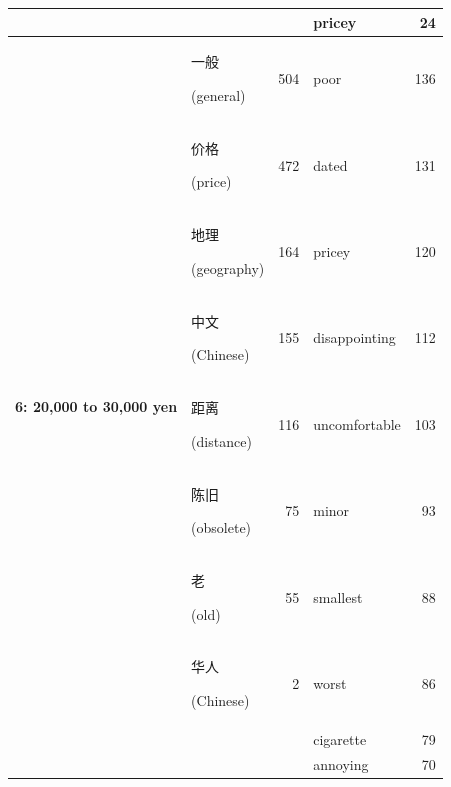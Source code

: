 \documentclass[smallextended,natbib]{svjour3}       %
\begin{document}
\begin{table}[ht]
{\begin{tabular}{|c|lr|lr|}
                                                             &                                                &      & pricey         & 24  \\ \hline
        \multirow{10}{*}{\textbf{6: 20,000 to 30,000 yen}}   & \begin{CJK}{UTF8}{gbsn}一般\end{CJK} (general)   & 504  & poor           & 136 \\  
                                                             & \begin{CJK}{UTF8}{gbsn}价格\end{CJK} (price)     & 472  & dated          & 131 \\  
                                                             & \begin{CJK}{UTF8}{gbsn}地理\end{CJK} (geography) & 164  & pricey         & 120 \\  
                                                             & \begin{CJK}{UTF8}{gbsn}中文\end{CJK} (Chinese)   & 155  & disappointing  & 112 \\  
                                                             & \begin{CJK}{UTF8}{gbsn}距离\end{CJK} (distance)  & 116  & uncomfortable  & 103 \\  
                                                             & \begin{CJK}{UTF8}{gbsn}陈旧\end{CJK} (obsolete)  & 75   & minor          & 93  \\  
                                                             & \begin{CJK}{UTF8}{gbsn}老\end{CJK} (old)        & 55   & smallest       & 88  \\  
                                                             & \begin{CJK}{UTF8}{gbsn}华人\end{CJK} (Chinese)   & 2    & worst          & 86  \\  
                                                             &                                                &      & cigarette      & 79  \\  
                                                             &                                                &      & annoying       & 70  \\ \hline

\end{tabular}}
\end{table}
\end{document}
